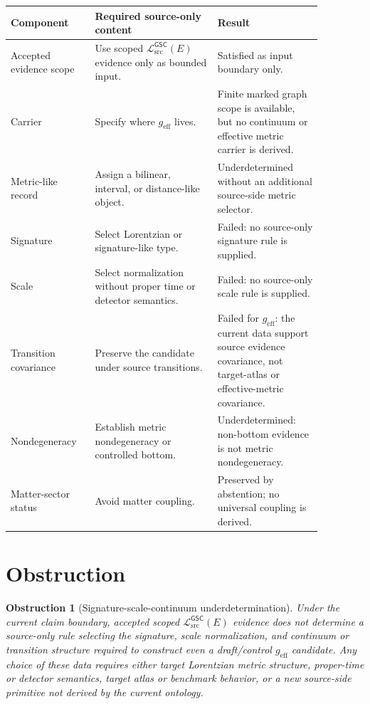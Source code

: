 \documentclass[11pt]{article}
\newcommand{\MetricData}{\mathcal{L}_{\mathrm{src}}^{\mathsf{GSC}}}
\newcommand{\geff}{g_{\mathrm{eff}}}
\newtheorem{obstruction}{Obstruction}
\begin{document}
\begin{longtable}{p{0.22\linewidth}p{0.35\linewidth}p{0.30\linewidth}}
\toprule
Component & Required source-only content & Result \\
\midrule
Accepted evidence scope & Use scoped \(\MetricData(E)\) evidence only as
bounded input. & Satisfied as input boundary only. \\
Carrier & Specify where \(\geff\) lives. & Finite marked graph scope is
available, but no continuum or effective metric carrier is derived. \\
Metric-like record & Assign a bilinear, interval, or distance-like object. &
Underdetermined without an additional source-side metric selector. \\
Signature & Select Lorentzian or signature-like type. & Failed: no
source-only signature rule is supplied. \\
Scale & Select normalization without proper time or detector semantics. &
Failed: no source-only scale rule is supplied. \\
Transition covariance & Preserve the candidate under source transitions. &
Failed for \(\geff\): the current data support source evidence covariance,
not target-atlas or effective-metric covariance. \\
Nondegeneracy & Establish metric nondegeneracy or controlled bottom. &
Underdetermined: non-bottom evidence is not metric nondegeneracy. \\
Matter-sector status & Avoid matter coupling. & Preserved by abstention; no
universal coupling is derived. \\
\bottomrule
\end{longtable}

\section{Obstruction}

\begin{obstruction}[Signature-scale-continuum underdetermination]
\label{ob:geff-signature-scale-continuum}
Under the current claim boundary, accepted scoped \(\MetricData(E)\) evidence
does not determine a source-only rule selecting the signature, scale
normalization, and continuum or transition structure required to construct
even a draft/control \(\geff\) candidate. Any choice of these data requires
either target Lorentzian metric structure, proper-time or detector semantics,
target atlas or benchmark behavior, or a new source-side primitive not
derived by the current ontology.
\end{obstruction}
\end{document}
